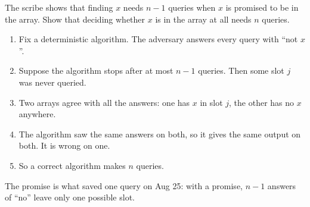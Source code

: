 
\begin{exercisebox}
\begin{pproblem}\label{pp:membership}
    The scribe shows that finding $x$ needs $n - 1$ queries when $x$ is promised to be in the array.
    Show that deciding whether $x$ is in the array at all needs $n$ queries.
\end{pproblem}
\tcblower
\begin{wsolution}
    \leavevmode
    \begin{enumerate}
        \item Fix a deterministic algorithm. The adversary answers every query with ``not $x$''.
        \item Suppose the algorithm stops after at most $n - 1$ queries. Then some slot $j$ was never
              queried.
        \item Two arrays agree with all the answers: one has $x$ in slot $j$, the other has no $x$
              anywhere.
        \item The algorithm saw the same answers on both, so it gives the same output on both. It is
              wrong on one.
        \item So a correct algorithm makes $n$ queries.
    \end{enumerate}
    The promise is what saved one query on Aug 25: with a promise, $n - 1$ answers of ``no'' leave
    only one possible slot.
\end{wsolution}
\end{exercisebox}

